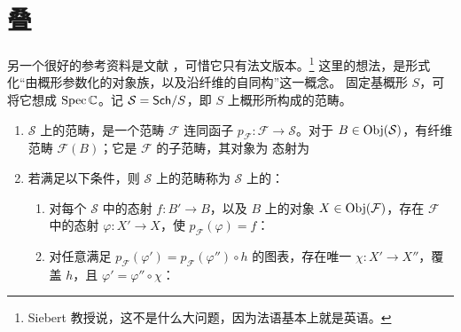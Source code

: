 \section{叠}
另一个很好的参考资料是文献 \cite{ref20}，可惜它只有法文版本。\footnote{Siebert 教授说，这不是什么大问题，因为法语基本上就是英语。}
这里的想法，是形式化“由概形参数化的对象族，以及沿纤维的自同构”这一概念。
固定基概形 $S$，可将它想成 $\operatorname{Spec}\mathbb C$。记 $\mathcal S=\mathsf{Sch}/S$，即 $S$ 上概形所构成的范畴。
\begin{definition}\label{def:2.1}
\begin{enumerate}
\item $\mathcal S$ 上的范畴，是一个范畴 $\mathcal F$ 连同函子 $p_{\mathcal F}:\mathcal F\to\mathcal S$。对于 $B\in\operatorname{Obj}(\mathcal S)$，有纤维范畴 $\mathcal F(B)$；它是 $\mathcal F$ 的子范畴，其对象为
态射为
\item 若满足以下条件，则 $\mathcal S$ 上的范畴称为 $\mathcal S$ 上的：
\begin{enumerate}
\item 对每个 $\mathcal S$ 中的态射 $f:B'\to B$，以及 $B$ 上的对象 $X\in\operatorname{Obj}(\mathcal F)$，存在 $\mathcal F$ 中的态射 $\varphi:X'\to X$，使 $p_{\mathcal F}(\varphi)=f$：
\item 对任意满足 $p_{\mathcal F}(\varphi')=p_{\mathcal F}(\varphi'')\circ h$ 的图表，存在唯一 $\chi:X'\to X''$，覆盖 $h$，且 $\varphi'=\varphi''\circ\chi$：
\end{enumerate}
\end{enumerate}
\end{definition}
